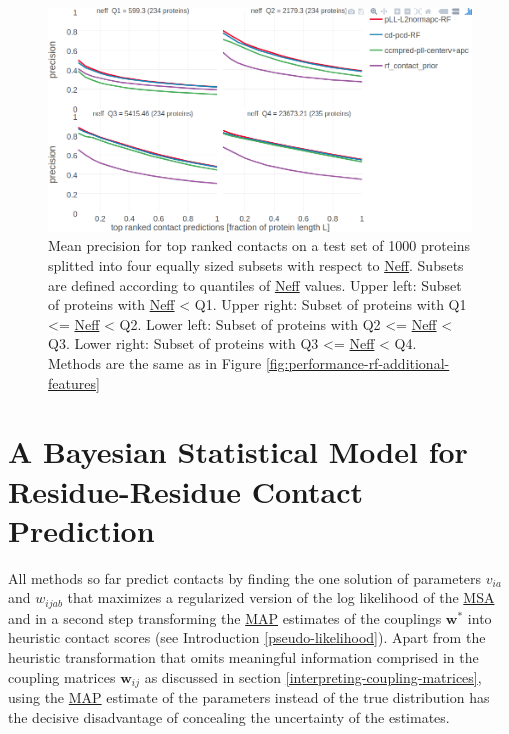 \documentclass[11pt,a4paper,twoside]{book}
\newcommand{\via}{v_{ia}}
\newcommand{\w}{\mathbf{w}}
\newcommand{\wij}{\mathbf{w}_{ij}}
\newcommand{\wijab}{w_{ijab}}
\theoremstyle{definition}
\theoremstyle{definition}
\theoremstyle{remark}
\begin{document}
\begin{figure}
\includegraphics[width=1\linewidth]{img/random_forest_contact_prior/additional_contat_score_features/precision_vs_rank_facetted_by_neff_rf_pll_cd} \caption{Mean precision for
top ranked contacts on a test set of 1000 proteins splitted into four
equally sized subsets with respect to \protect\hyperlink{abbrev}{Neff}.
Subsets are defined according to quantiles of
\protect\hyperlink{abbrev}{Neff} values. Upper left: Subset of proteins
with \protect\hyperlink{abbrev}{Neff} \textless{} Q1. Upper right:
Subset of proteins with Q1 \textless{}= \protect\hyperlink{abbrev}{Neff}
\textless{} Q2. Lower left: Subset of proteins with Q2 \textless{}=
\protect\hyperlink{abbrev}{Neff} \textless{} Q3. Lower right: Subset of
proteins with Q3 \textless{}= \protect\hyperlink{abbrev}{Neff}
\textless{} Q4. Methods are the same as in Figure
\ref{fig:performance-rf-additional-features}}\label{fig:performance-neff-rf-additional-features}
\end{figure}

\chapter{A Bayesian Statistical Model for Residue-Residue Contact
Prediction}\label{a-bayesian-statistical-model-for-residue-residue-contact-prediction}

All methods so far predict contacts by finding the one solution of
parameters \(\via\) and \(\wijab\) that maximizes a regularized version
of the log likelihood of the \protect\hyperlink{abbrev}{MSA} and in a
second step transforming the \protect\hyperlink{abbrev}{MAP} estimates
of the couplings \(\w^*\) into heuristic contact scores (see
Introduction \ref{pseudo-likelihood}). Apart from the heuristic
transformation that omits meaningful information comprised in the
coupling matrices \(\wij\) as discussed in section
\ref{interpreting-coupling-matrices}, using the
\protect\hyperlink{abbrev}{MAP} estimate of the parameters instead of
the true distribution has the decisive disadvantage of concealing the
uncertainty of the estimates.
\end{document}
